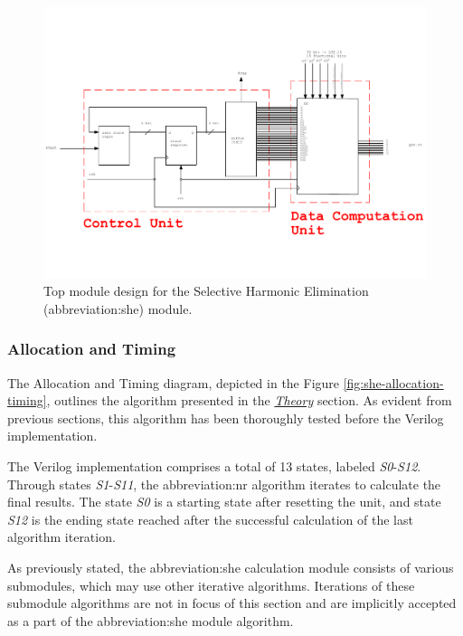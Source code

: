 \documentclass[a4paper, twoside, 11pt]{article}
\begin{document}
            \begin{figure}[htbp!]
                \centering
                \includegraphics[width=1\textwidth]{src/pdf/she-top-module.pdf}
                           \caption{Top module design for the Selective Harmonic Elimination (\gls{abbreviation:she}) module.}
                \label{fig:she-top-module}
            \end{figure}

    \FloatBarrier
        \subsubsection{Allocation and Timing}\label{subsubsec:she-allocation-and-timing}
            The Allocation and Timing diagram, depicted in the Figure \ref{fig:she-allocation-timing}, outlines the algorithm presented in the \hyperref[subsec:she-theory]{\textit{Theory}} section. As evident from previous sections, this algorithm has been thoroughly tested before the Verilog implementation.\par
            The Verilog implementation comprises a total of 13 states, labeled \textit{S0}-\textit{S12}. Through states \textit{S1}-\textit{S11}, the \gls{abbreviation:nr} algorithm iterates to calculate the final results. The state \textit{S0} is a starting state after resetting the unit, and state \textit{S12} is the ending state reached after the successful calculation of the last algorithm iteration.\par
            As previously stated, the \gls{abbreviation:she} calculation module consists of various submodules, which may use other iterative algorithms. Iterations of these submodule algorithms are not in focus of this section and are implicitly accepted as a part of the \gls{abbreviation:she} module algorithm.
\end{document}
